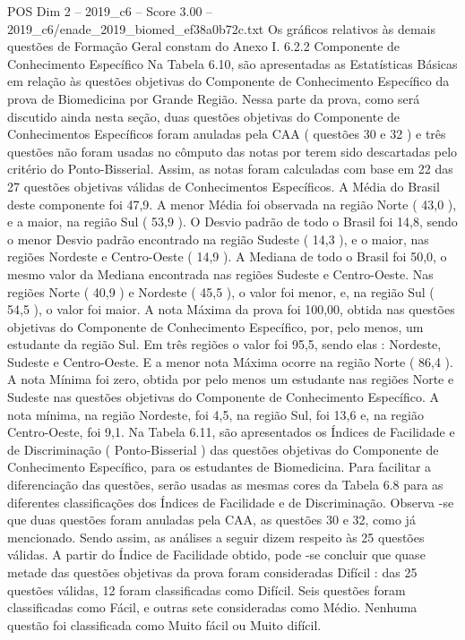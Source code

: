 \begin{textsample}{POS Dim 2 – 2019\_c6 – Score 3.00 – 2019\_c6/enade\_2019\_biomed\_ef38a0b72c.txt}
Os gráficos relativos às demais questões de Formação Geral constam do Anexo I. 6.2.2 Componente de Conhecimento Específico Na Tabela 6.10, são apresentadas as Estatísticas Básicas em relação às questões objetivas do Componente de Conhecimento Específico da prova de Biomedicina por Grande Região.
Nessa parte da prova, como será discutido ainda nesta seção, duas questões objetivas do Componente de Conhecimentos Específicos foram anuladas pela CAA ( questões 30 e 32 ) e três questões não foram usadas no cômputo das notas por terem sido descartadas pelo critério do Ponto-Bisserial.
Assim, as notas foram calculadas com base em 22 das 27 questões objetivas válidas de Conhecimentos Específicos.
A Média do Brasil deste componente foi 47,9.
A menor Média foi observada na região Norte ( 43,0 ), e a maior, na região Sul ( 53,9 ).
O Desvio padrão de todo o Brasil foi 14,8, sendo o menor Desvio padrão encontrado na região Sudeste ( 14,3 ), e o maior, nas regiões Nordeste e Centro-Oeste ( 14,9 ).
A Mediana de todo o Brasil foi 50,0, o mesmo valor da Mediana encontrada nas regiões Sudeste e Centro-Oeste.
Nas regiões Norte ( 40,9 ) e Nordeste ( 45,5 ), o valor foi menor, e, na região Sul ( 54,5 ), o valor foi maior.
A nota Máxima da prova foi 100,00, obtida nas questões objetivas do Componente de Conhecimento Específico, por, pelo menos, um estudante da região Sul.
Em três regiões o valor foi 95,5, sendo elas : Nordeste, Sudeste e Centro-Oeste.
E a menor nota Máxima ocorre na região Norte ( 86,4 ).
A nota Mínima foi zero, obtida por pelo menos um estudante nas regiões Norte e Sudeste nas questões objetivas do Componente de Conhecimento Específico.
A nota mínima, na região Nordeste, foi 4,5, na região Sul, foi 13,6 e, na região Centro-Oeste, foi 9,1.
Na Tabela 6.11, são apresentados os Índices de Facilidade e de Discriminação ( Ponto-Bisserial ) das questões objetivas do Componente de Conhecimento Específico, para os estudantes de Biomedicina.
Para facilitar a diferenciação das questões, serão usadas as mesmas cores da Tabela 6.8 para as diferentes classificações dos Índices de Facilidade e de Discriminação.
Observa -se que duas questões foram anuladas pela CAA, as questões 30 e 32, como já mencionado.
Sendo assim, as análises a seguir dizem respeito às 25 questões válidas.
A partir do Índice de Facilidade obtido, pode -se concluir que quase metade das questões objetivas da prova foram consideradas Difícil : das 25 questões válidas, 12 foram classificadas como Difícil.
Seis questões foram classificadas como Fácil, e outras sete consideradas como Médio.
Nenhuma questão foi classificada como Muito fácil ou Muito difícil.

\end{textsample}
